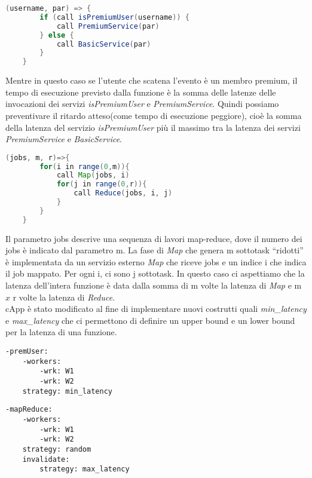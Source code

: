 \documentclass[../main.tex]{subfiles}
\begin{document}
\begin{lstlisting}[language=Java, caption= La guardia della condizione è un'invocazione a un servizio esterno,label={lst:2}]
    (username, par) => {
        if (call isPremiumUser(username)) {
            call PremiumService(par)
        } else {
            call BasicService(par)
        }
    }
\end{lstlisting}

Mentre in questo caso se l'utente che scatena l'evento è un membro premium, il tempo di esecuzione previsto dalla funzione è la somma delle latenze delle invocazioni dei servizi \textit{isPremiumUser} e \textit{PremiumService}.
Quindi possiamo preventivare il ritardo atteso(come tempo di esecuzione peggiore), cioè la somma della latenza del servizio \textit{isPremiumUser} più il massimo tra la latenza dei servizi \textit{PremiumService} e \textit{BasicService}.

\begin{lstlisting}[language=Java, caption=Funzione con logica Map-Reduce,label={lst:3}]
    (jobs, m, r)=>{
        for(i in range(0,m)){
            call Map(jobs, i)
            for(j in range(0,r)){
                call Reduce(jobs, i, j)
            }
        }
    }
\end{lstlisting}
Il parametro jobs descrive una sequenza di lavori map-reduce, dove il numero dei jobs è indicato dal parametro m.
La fase di \textit{Map} che genera m sottotask ``ridotti'' è implementata da un servizio esterno \textit{Map} che riceve jobs e un indice i che indica il job mappato.
Per ogni i, ci sono j sottotask.
In questo caso ci aspettiamo che la latenza dell'intera funzione è data dalla somma di m volte la latenza di \textit{Map} e m $x$ r volte la latenza di \textit{Reduce}.\\

cApp è stato modificato al fine di implementare nuovi costrutti quali \textit{min\_latency} e \textit{max\_latency} che ci permettono di definire un upper bound e un lower bound per la latenza di una funzione.
\begin{multicols}{2}
    \begin{lstlisting}[caption={cAPP for Listing \ref{lst:1} e \ref{lst:2}},label={lst:4}]
-premUser:
    -workers:
        -wrk: W1
        -wrk: W2
    strategy: min_latency
    \end{lstlisting}
    \columnbreak
    \begin{lstlisting}[caption={cApp for Listing~\ref{lst:3}}, label={lst:5}]
-mapReduce:
    -workers:
        -wrk: W1
        -wrk: W2
    strategy: random
    invalidate:
        strategy: max_latency
    \end{lstlisting}
\end{multicols}
\end{document}
